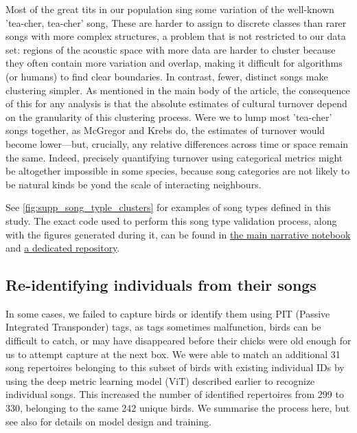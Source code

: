 \documentclass[9pt, onecolumn, twoside, lineno]{gsajnl}
\begin{document}
Most of the great tits in our population sing some variation of the well-known 'tea-cher, tea-cher' song, These are harder to assign to discrete classes than rarer songs with more complex structures, a problem that is not restricted to our data set: regions of the acoustic space with more data are harder to cluster because they often contain more variation and overlap, making it difficult for algorithms (or humans) to find clear boundaries. In contrast, fewer, distinct songs make clustering simpler. As mentioned in the main body of the article, the consequence of this for any analysis is that the absolute estimates of cultural turnover depend on the granularity of this clustering process. Were we to lump most 'tea-cher' songs together, as McGregor and Krebs \autocite{mcgregor1982b} do, the estimates of turnover would become lower---but, crucially, any relative differences across time or space remain the same. Indeed, precisely quantifying turnover using categorical metrics might be altogether impossible in some species, because song categories are not likely to be natural kinds be    yond the scale of interacting neighbours. 

See \autoref{fig:supp_song_typle_clusters} for examples of song types defined in this study. The exact code used to perform this song type validation process, along with the figures generated during it, can be found in \href{https://github.com/nilomr/wytham-songtype-validation/blob/main/notebooks/4_train-model.ipynb}{the main narrative notebook} and \href{https://github.com/nilomr/wytham-songtype-validation}{a dedicated repository}.

\subsection{Re-identifying individuals from their songs}

In some cases, we failed to capture birds or identify them using PIT (Passive Integrated Transponder) tags, as tags sometimes malfunction, birds can be difficult to catch, or may have disappeared before their chicks were old enough for us to attempt capture at the next box. We were able to match an additional 31 song repertoires belonging to this subset of birds with existing individual IDs by using the deep metric learning model (ViT) described earlier to recognize individual songs. This increased the number of identified repertoires from 299 to 330, belonging to the same 242 unique birds. We summarise the process here, but see also \autocite{merinorecalde2023a} for details on model design and training.
\end{document}
